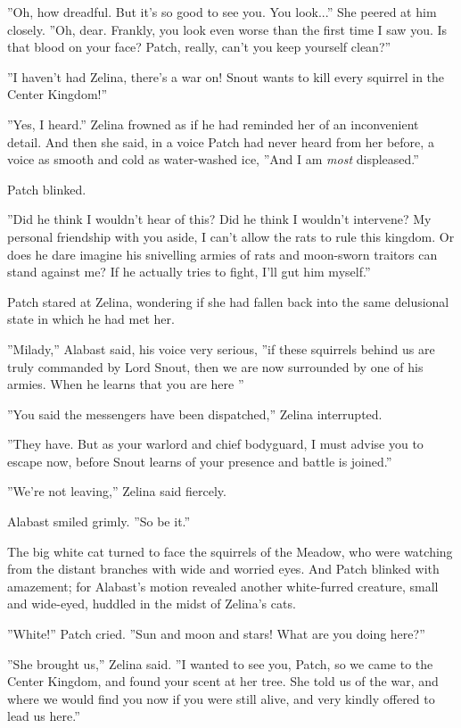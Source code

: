 \documentclass[11pt]{article}
\begin{document}
 ''Oh, how dreadful. But it's so good to see you. You look...'' She peered at him closely. ''Oh, dear. Frankly, you look even worse than the first time I saw you. Is that blood on your face? Patch, really, can't you keep yourself clean?''\par
 ''I haven't had %
 Zelina, there's a war on! Snout wants to kill every squirrel in the Center Kingdom!''\par
''Yes, I heard.'' Zelina frowned as if he had reminded her of an inconvenient detail. And then she said, in a voice Patch had never heard from her before, a voice as smooth and cold as water-washed ice, ''And I am {\it most} displeased.''\par
 Patch blinked.\par
 ''Did he think I wouldn't hear of this? Did he think I wouldn't intervene? My personal friendship with you aside, I can't allow the rats to rule this kingdom. Or does he dare imagine his snivelling armies of rats and moon-sworn traitors can stand against me? If he actually tries to fight, I'll gut him myself.''\par
 Patch stared at Zelina, wondering if she had fallen back into the same delusional state in which he had met her.\par
 ''Milady,'' Alabast said, his voice very serious, ''if these squirrels behind us are truly commanded by Lord Snout, then we are now surrounded by one of his armies. When he learns that you are here %
''\par
 ''You said the messengers have been dispatched,'' Zelina interrupted.\par
 ''They have. But as your warlord and chief bodyguard, I must advise you to escape now, before Snout learns of your presence and battle is joined.''\par
 ''We're not leaving,'' Zelina said fiercely.\par
 Alabast smiled grimly. ''So be it.''\par
 The big white cat turned to face the squirrels of the Meadow, who were watching from the distant branches with wide and worried eyes. And Patch blinked with amazement; for Alabast's motion revealed another white-furred creature, small and wide-eyed, huddled in the midst of Zelina's cats.\par
 ''White!'' Patch cried. ''Sun and moon and stars! What are you doing here?''\par
 ''She brought us,'' Zelina said. ''I wanted to see you, Patch, so we came to the Center Kingdom, and found your scent at her tree. She told us of the war, and where we would find you now if you were still alive, and very kindly offered to lead us here.''\par
\end{document}
